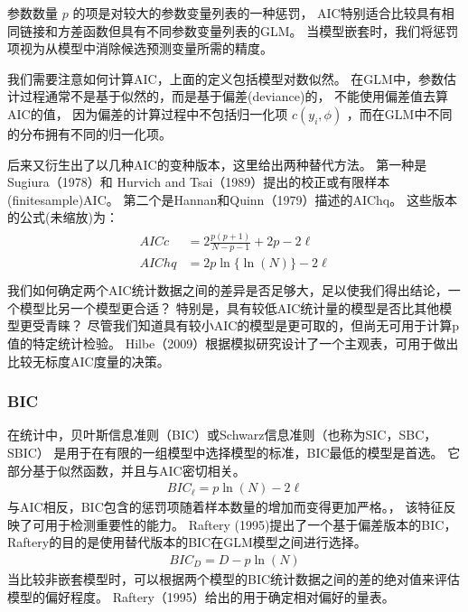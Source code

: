 \documentclass[letterpaper,10pt,english]{sphinxmanual}
\begin{document}
参数数量 \(p\) 的项是对较大的参数变量列表的一种惩罚，
AIC特别适合比较具有相同链接和方差函数但具有不同参数变量列表的GLM。
当模型嵌套时，我们将惩罚项视为从模型中消除候选预测变量所需的精度。

我们需要注意如何计算AIC，上面的定义包括模型对数似然。
在GLM中，参数估计过程通常不是基于似然的，而是基于偏差(deviance)的，
不能使用偏差值去算AIC的值，
因为偏差的计算过程中不包括归一化项 \(c(y_i,\phi)\)
，而在GLM中不同的分布拥有不同的归一化项。

后来又衍生出了以几种AIC的变种版本，这里给出两种替代方法。
第一种是 Sugiura（1978）和 Hurvich and Tsai（1989）提出的校正或有限样本(finite\sphinxhyphen{}sample)AIC。
第二个是Hannan和Quinn（1979）描述的AIChq。
这些版本的公式(未缩放)为：
\begin{align}\label{equation:模型评估/content:模型评估/content:36}\!\begin{aligned}
AICc &= 2\frac{p(p+1)}{N-p-1}+ 2p -2 \ell\\
AIChq &= 2p\ln\{ \ln(N)\} -2 \ell\\
\end{aligned}\end{align}
我们如何确定两个AIC统计数据之间的差异是否足够大，足以使我们得出结论，一个模型比另一个模型更合适？
特别是，具有较低AIC统计量的模型是否比其他模型更受青睐？
尽管我们知道具有较小AIC的模型是更可取的，但尚无可用于计算p\sphinxhyphen{}值的特定统计检验。
Hilbe（2009）根据模拟研究设计了一个主观表，可用于做出比较无标度AIC度量的决策。

\begin{figure}[htbp]
\centering

\noindent{}
\end{figure}


\subsubsection{BIC}
\label{\detokenize{_u6a21_u578b_u8bc4_u4f30/content:bic}}
在统计中，贝叶斯信息准则（BIC）或Schwarz信息准则（也称为SIC，SBC，SBIC）
是用于在有限的一组模型中选择模型的标准，BIC最低的模型是首选。
它部分基于似然函数，并且与AIC密切相关。
\begin{equation}\label{equation:模型评估/content:模型评估/content:37}
\begin{split}BIC_{\ell} = p\ln(N) - 2 \ell\end{split}
\end{equation}
与AIC相反，BIC包含的惩罚项随着样本数量的增加而变得更加严格。，
该特征反映了可用于检测重要性的能力。
Raftery (1995)提出了一个基于偏差版本的BIC，
Raftery的目的是使用替代版本的BIC在GLM模型之间进行选择。
\begin{equation}\label{equation:模型评估/content:模型评估/content:38}
\begin{split}BIC_D = D - p \ln(N)\end{split}
\end{equation}
当比较非嵌套模型时，可以根据两个模型的BIC统计数据之间的差的绝对值来评估模型的偏好程度。
Raftery（1995）给出的用于确定相对偏好的量表。
\end{document}
